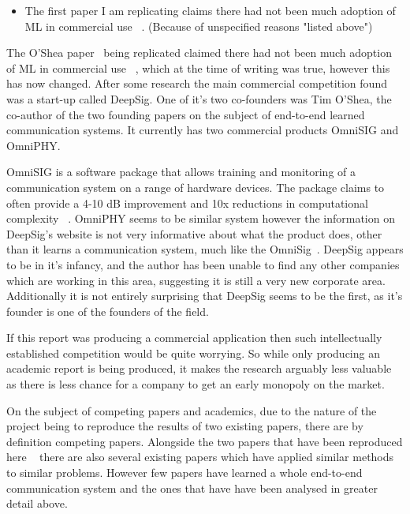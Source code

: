 \documentclass[12pt,onecolumn,letterpaper]{article}
\begin{document}
\begin{itemize}
    \item The first paper I am replicating claims there had not been much adoption of ML in commercial use ~\cite{oShea}. (Because of unspecified reasons "listed above")
\end{itemize}

The O'Shea paper~\cite{oShea} being replicated claimed there had not been much adoption of ML in commercial use ~\cite{oShea}, which at the time of writing was true, however this has now changed. After some research the main commercial competition found was a start-up called DeepSig. One of it's two co-founders was Tim O'Shea, the co-author of the two founding papers on the subject of end-to-end learned communication systems. It currently has two commercial products OmniSIG and OmniPHY.

OmniSIG is a software package that allows training and monitoring of a communication system on a range of hardware devices. The package claims to often provide a 4-10 dB improvement and 10x reductions in computational complexity ~\cite{DeepsigOmnisig}. OmniPHY seems to be similar system however the information on DeepSig's website is not very informative about what the product does, other than it learns a communication system, much like the OmniSig~\cite{DeepsigOmniphy}. DeepSig appears to be in it's infancy, and the author has been unable to find any other companies which are working in this area, suggesting it is still a very new corporate area. Additionally it is not entirely surprising that DeepSig seems to be the first, as it's founder is one of the founders of the field. 

If this report was producing a commercial application then such intellectually established competition would be quite worrying. So while only producing an academic report is being produced, it makes the research arguably less valuable as there is less chance for a company to get an early monopoly on the market. 

On the subject of competing papers and academics, due to the nature of the project being to reproduce the results of two existing papers, there are by definition competing papers. Alongside the two papers that have been reproduced here ~\cite{oShea,Aoudia} there are also several existing papers which have applied similar methods to similar problems. However few papers have learned a whole end-to-end communication system and the ones that have have been analysed in greater detail above.
\end{document}
